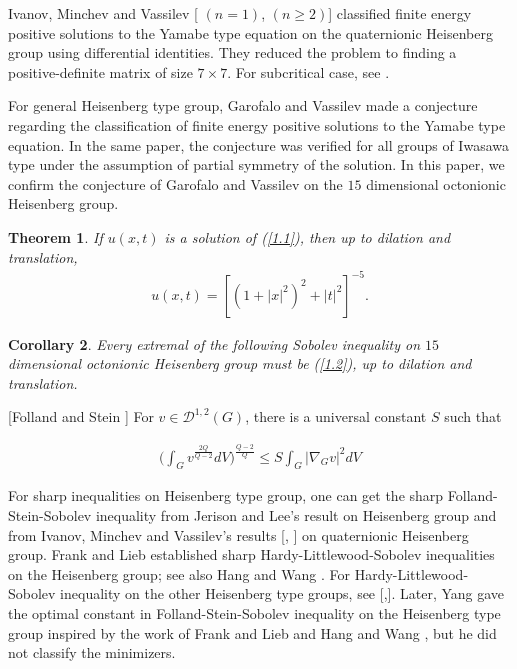 \documentclass[reqno,12pt]{amsart}
\numberwithin{equation}{section}
\theoremstyle{plain}
\newtheorem{theorem}{Theorem}[section]
\newtheorem{corollary}[theorem]{Corollary}
\theoremstyle{definition}
\begin{document}
Ivanov, Minchev and Vassilev [\cite{IMV2010} $(n=1)$, \cite{IMV2023} $(n\geq 2)$] classified finite energy positive solutions to the Yamabe type equation on the quaternionic Heisenberg group  using differential identities. They reduced the problem to finding a positive-definite  matrix of size $7\times 7$. For subcritical case, see \cite{LZ}.

For general Heisenberg type group, Garofalo and Vassilev \cite{GV2001} made a conjecture regarding the classification of finite energy positive solutions to the  Yamabe type equation. In the same paper, the conjecture  was verified for all groups of Iwasawa type under the assumption of partial symmetry of the solution. In this paper, we confirm the conjecture of Garofalo and Vassilev on the $15$ dimensional octonionic Heisenberg group.



\begin{theorem}If $u(x,t)$ is a solution of (\ref{1.1}), then up to dilation and translation,     \begin{align}\label{1.2}
     u(x,t)=[(1+|x|^2)^2+|t|^2]^{-5}.
     \end{align}\end{theorem}







 \begin{corollary}
    Every  extremal of the following Sobolev inequality on $15$ dimensional octonionic Heisenberg group must be  (\ref{1.2}), up to dilation and translation. 
 \end{corollary}
 
[Folland and Stein \cite{FS1974}] For $v\in \mathscr{D}^{1,2}(G)$, there is a universal constant $S$ such that


    \begin{align}\label{1.3}
         \bigg(\int_{G}v^\frac{2Q}{Q-2}dV\bigg)^\frac{Q-2}{Q}\leq S\int_{G}|\nabla_G v|^2dV
     \end{align}


 
For sharp inequalities on Heisenberg type group, one can get the sharp Folland-Stein-Sobolev inequality from Jerison and Lee's result \cite{JL1988} on Heisenberg group and from Ivanov, Minchev and Vassilev's results [\cite{IMV2010}, \cite{IMV2023}] on quaternionic Heisenberg group. Frank and Lieb \cite{FL2012} established sharp Hardy-Littlewood-Sobolev inequalities on the Heisenberg group; see also Hang and Wang \cite{HW2022}. For Hardy-Littlewood-Sobolev inequality on the other Heisenberg type groups, see [\cite{CLZ},\cite{CLZ2}]. Later, Yang \cite{Y2024} gave the optimal constant in Folland-Stein-Sobolev inequality on the Heisenberg type group inspired by the work of Frank and Lieb \cite{FL2012} and Hang and Wang \cite{HW2022}, but he did not classify the minimizers.
\end{document}
